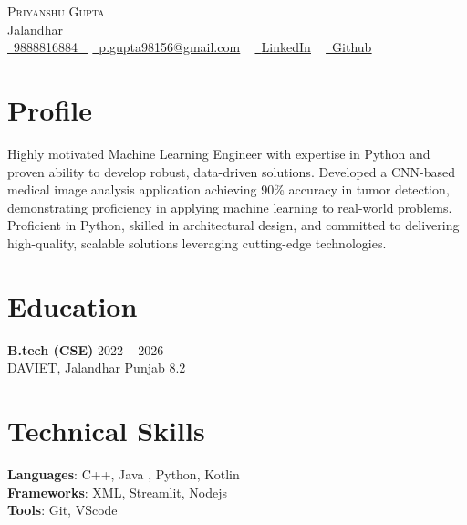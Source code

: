 \documentclass[letterpaper,11pt]{article}
\begin{document}

\begin{center}
    {\Huge \scshape Priyanshu Gupta} \\ \vspace{1pt}
    Jalandhar \\ \vspace{1pt}
    \small 
    \small \href{9888816884}{ \raisebox{-0.1\height}\faPhone\ \underline{9888816884} ~} 
    \href{p.gupta98156@gmail.com}{\raisebox{-0.2\height}\faEnvelope\  \underline{p.gupta98156@gmail.com}} ~
    \href{https://www.linkedin.com/in/priyanshu-gupta18/}{\raisebox{-0.2\height}\faLinkedinSquare\ \underline{LinkedIn}}  ~
    \href{https://github.com/Priyanshu98156/MedVision}{\raisebox{-0.2\height}\faGithub\ \underline{Github}} ~
\end{center}
% 

\section{Profile}
Highly motivated Machine Learning Engineer with expertise in Python and proven ability to develop robust, data-driven solutions.  Developed a CNN-based medical image analysis application achieving 90\% accuracy in tumor detection, demonstrating proficiency in applying machine learning to real-world problems.  Proficient in Python,  skilled in  architectural design, and committed to delivering high-quality, scalable solutions leveraging cutting-edge technologies.\\ 


\section*{Education}
\textbf{B.tech (CSE)} \hfill 2022 -- 2026 \\[2pt]
DAVIET, Jalandhar Punjab \hfill 8.2 \\[6pt]






\section*{Technical Skills}
\textbf{Languages}: C++, Java , Python,  Kotlin \\[4pt]
\textbf{Frameworks}: XML, Streamlit, Nodejs \\[4pt]
\textbf{Tools}: Git, VScode \\[4pt]
\end{document}

